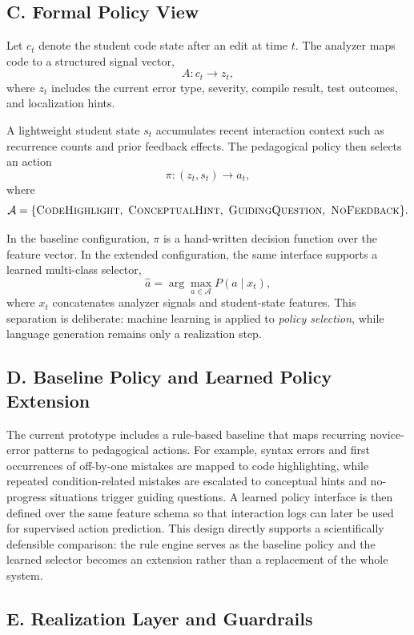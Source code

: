 ﻿\documentclass[conference]{IEEEtran}
\begin{document}
\subsection*{C. Formal Policy View}

Let $c_t$ denote the student code state after an edit at time $t$. The analyzer maps code to a structured signal vector,
\[
A: c_t \rightarrow z_t,
\]
where $z_t$ includes the current error type, severity, compile result, test outcomes, and localization hints.

A lightweight student state $s_t$ accumulates recent interaction context such as recurrence counts and prior feedback effects. The pedagogical policy then selects an action
\[
\pi: (z_t, s_t) \rightarrow a_t,
\]
where
\[
\mathcal{A}=\{\textsc{CodeHighlight},\ \textsc{ConceptualHint},\ \textsc{GuidingQuestion},\ \textsc{NoFeedback}\}.
\]

In the baseline configuration, $\pi$ is a hand-written decision function over the feature vector. In the extended configuration, the same interface supports a learned multi-class selector,
\[
\hat{a}=\arg\max_{a \in \mathcal{A}} P(a \mid x_t),
\]
where $x_t$ concatenates analyzer signals and student-state features. This separation is deliberate: machine learning is applied to \emph{policy selection}, while language generation remains only a realization step.

\subsection*{D. Baseline Policy and Learned Policy Extension}

The current prototype includes a rule-based baseline that maps recurring novice-error patterns to pedagogical actions. For example, syntax errors and first occurrences of off-by-one mistakes are mapped to code highlighting, while repeated condition-related mistakes are escalated to conceptual hints and no-progress situations trigger guiding questions. A learned policy interface is then defined over the same feature schema so that interaction logs can later be used for supervised action prediction. This design directly supports a scientifically defensible comparison: the rule engine serves as the baseline policy and the learned selector becomes an extension rather than a replacement of the whole system.

\subsection*{E. Realization Layer and Guardrails}
\end{document}
